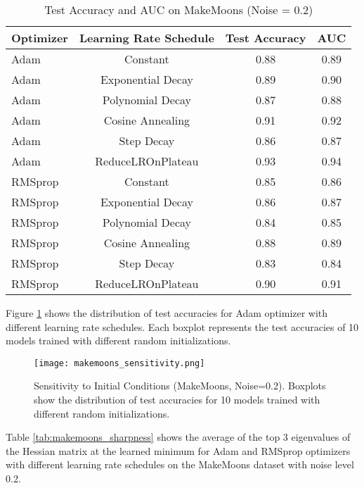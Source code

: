 \documentclass[conference]{IEEEtran}
\begin{document}
\begin{table}[htbp]
\centering
\caption{Test Accuracy and AUC on MakeMoons (Noise = 0.2)}
\label{tab:makemoons_results}
\begin{tabular}{@{}lccc@{}}
\toprule
Optimizer & Learning Rate Schedule & Test Accuracy & AUC \\ \midrule
Adam      & Constant              & 0.88          & 0.89 \\
Adam      & Exponential Decay     & 0.89          & 0.90 \\
Adam      & Polynomial Decay      & 0.87          & 0.88 \\
Adam      & Cosine Annealing      & 0.91          & 0.92 \\
Adam      & Step Decay            & 0.86          & 0.87 \\
Adam      & ReduceLROnPlateau     & 0.93          & 0.94 \\
RMSprop   & Constant              & 0.85          & 0.86 \\
RMSprop   & Exponential Decay     & 0.86          & 0.87 \\
RMSprop   & Polynomial Decay      & 0.84          & 0.85 \\
RMSprop   & Cosine Annealing      & 0.88          & 0.89 \\
RMSprop   & Step Decay            & 0.83          & 0.84 \\
RMSprop   & ReduceLROnPlateau     & 0.90          & 0.91 \\ \bottomrule
\end{tabular}
\end{table}

Figure \ref{fig:makemoons_sensitivity} shows the distribution of test accuracies for Adam optimizer with different learning rate schedules.  Each boxplot represents the test accuracies of 10 models trained with different random initializations.

\begin{figure}[htbp]
    \centering
    \texttt{[image: makemoons\_sensitivity.png]}
    \caption{Sensitivity to Initial Conditions (MakeMoons, Noise=0.2).  Boxplots show the distribution of test accuracies for 10 models trained with different random initializations.}
    \label{fig:makemoons_sensitivity}
\end{figure}

Table \ref{tab:makemoons_sharpness} shows the average of the top 3 eigenvalues of the Hessian matrix at the learned minimum for Adam and RMSprop optimizers with different learning rate schedules on the MakeMoons dataset with noise level 0.2.
\end{document}
